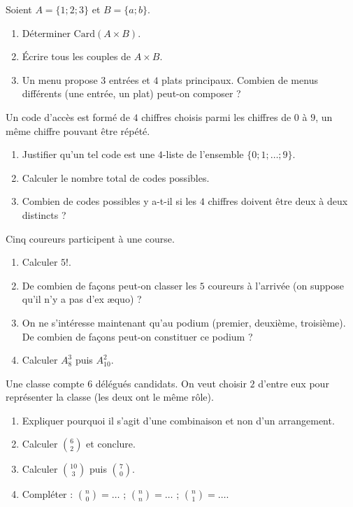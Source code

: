 \documentclass[11pt]{article}
\begin{document}
\begin{exercice}
Soient $A = \{1 ; 2 ; 3\}$ et $B = \{a ; b\}$.
\begin{enumerate}
  \item Déterminer $\mathrm{Card}(A \times B)$.
  \item Écrire tous les couples de $A \times B$.
  \item Un menu propose $3$ entrées et $4$ plats principaux. Combien de menus différents (une entrée, un plat) peut-on composer ?
\end{enumerate}
\end{exercice}

\begin{exercice}
Un code d'accès est formé de $4$ chiffres choisis parmi les chiffres de $0$ à $9$, un même chiffre pouvant être répété.
\begin{enumerate}
  \item Justifier qu'un tel code est une $4$-liste de l'ensemble $\{0 ; 1 ; \dots ; 9\}$.
  \item Calculer le nombre total de codes possibles.
  \item Combien de codes possibles y a-t-il si les $4$ chiffres doivent être deux à deux distincts ?
\end{enumerate}
\end{exercice}

\begin{exercice}
Cinq coureurs participent à une course.
\begin{enumerate}
  \item Calculer $5!$.
  \item De combien de façons peut-on classer les $5$ coureurs à l'arrivée (on suppose qu'il n'y a pas d'ex æquo) ?
  \item On ne s'intéresse maintenant qu'au podium (premier, deuxième, troisième). De combien de façons peut-on constituer ce podium ?
  \item Calculer $A_8^3$ puis $A_{10}^2$.
\end{enumerate}
\end{exercice}

\begin{exercice}[Combinaisons]
Une classe compte $6$ délégués candidats. On veut choisir $2$ d'entre eux pour représenter la classe (les deux ont le même rôle).
\begin{enumerate}
  \item Expliquer pourquoi il s'agit d'une combinaison et non d'un arrangement.
  \item Calculer $\binom{6}{2}$ et conclure.
  \item Calculer $\binom{10}{3}$ puis $\binom{7}{0}$.
  \item Compléter : $\binom{n}{0} = \dots$ ; $\binom{n}{n} = \dots$ ; $\binom{n}{1} = \dots$.
\end{enumerate}
\end{exercice}
\end{document}
